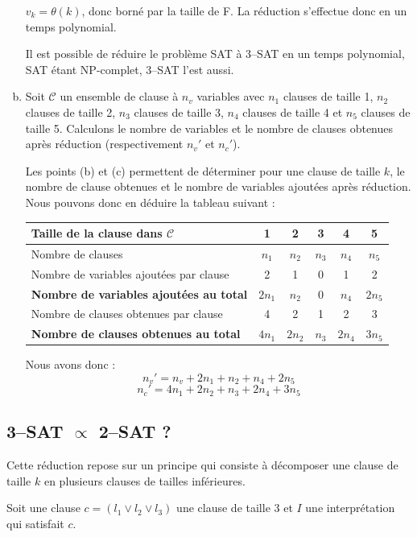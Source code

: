 \begin{enumerate}[(a)]
$v_k = \theta(k)$, donc borné par la taille de F. La réduction s'effectue donc en un temps polynomial.

Il est possible de réduire le problème SAT à 3--SAT en un temps polynomial, SAT étant NP-complet, 3--SAT l'est aussi.
\item Soit $\mathcal{C}$ un ensemble de clause à $n_v$ variables avec $n_1$ clauses de taille 1, $n_2$ clauses de taille 2, $n_3$ clauses de taille 3, $n_4$ clauses de taille 4 et $n_5$ clauses de taille 5. Calculons le nombre de variables et le nombre de clauses obtenues après réduction (respectivement $n_v'$ et $n_c'$).

Les points (b) et (c) permettent de déterminer pour une clause de taille $k$, le nombre de clause obtenues et le nombre de variables ajoutées après réduction. Nous pouvons donc en déduire la tableau suivant :

\begin{tabularx}{\textwidth}{| X || c | c | c | c | c |}
\hline
Taille de la clause dans $\mathcal{C}$	& 1 	& 2 	& 3 	& 4 	& 5 	\\
\hline
Nombre de clauses						& $n_1$	& $n_2$	& $n_3$	& $n_4$	& $n_5$	\\
\hline
Nombre de variables ajoutées par clause	& 2		& 1 	& 0 	& 1 	& 2 	\\
\hline
\textbf{Nombre de variables ajoutées au total} 	& $2n_1$& $n_2$	& 0		& $n_4$	& $2n_5$\\
\hline
Nombre de clauses obtenues par clause 	& 4 	& 2 	& 1 	& 2 	& 3 	\\
\hline
\textbf{Nombre de clauses obtenues au total}	& $4n_1$& $2n_2$& $n_3$	& $2n_4$& $3n_5$\\
\hline

\end{tabularx}

Nous avons donc :
\[ n_v' = n_v + 2n_1 + n_2 + n_4 + 2n_5 \]
\[ n_c' = 4n_1 + 2n_2 + n_3 + 2n_4 + 3n_5 \]
\end{enumerate}

\subsection{3--SAT $\propto$ 2--SAT ?}
Cette réduction repose sur un principe qui consiste à décomposer une clause de taille $k$ en plusieurs clauses de tailles inférieures.

Soit une clause $c = (l_1 \vee l_2 \vee l_3)$ une clause de taille 3 et $I$ une interprétation qui satisfait $c$.

